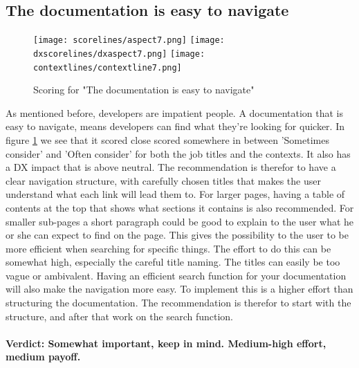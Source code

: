\documentclass{cslthse-msc}
\begin{document}
    \subsection{The documentation is easy to navigate}
    \begin{figure}[H]
        \centering
        \texttt{[image: scorelines/aspect7.png]}
        \texttt{[image: dxscorelines/dxaspect7.png]}
        \texttt{[image: contextlines/contextline7.png]}
        \caption{Scoring for "The documentation is easy to navigate"}
        \label{fig:aspect7}
    \end{figure}
    As mentioned before, developers are impatient people. A documentation that is easy to navigate, means developers can find what they're looking for quicker. In figure \ref{fig:aspect7} we see that it scored close scored somewhere in between 'Sometimes consider' and 'Often consider' for both the job titles and the contexts. It also has a DX impact that is above neutral. The recommendation is therefor to have a clear navigation structure, with carefully chosen titles that makes the user understand what each link will lead them to. For larger pages, having a table of contents at the top that shows what sections it contains is also recommended. For smaller sub-pages a short paragraph could be good to explain to the user what he or she can expect to find on the page. This gives the possibility to the user to be more efficient when searching for specific things. The effort to do this can be somewhat high, especially the careful title naming. The titles can easily be too vague or ambivalent. Having an efficient search function for your documentation will also make the navigation more easy. To implement this is a higher effort than structuring the documentation. The recommendation is therefor to start with the structure, and after that work on the search function. \\ \\
    \textbf{Verdict: Somewhat important, keep in mind. Medium-high effort, medium payoff.}
\end{document}
